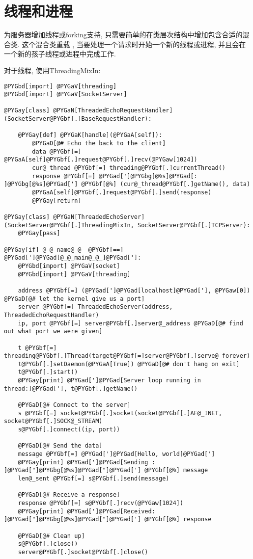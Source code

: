 \documentclass[a4paper,10pt,english]{manual}
\begin{document}
\section{线程和进程}

为服务器增加线程或forking支持, 只需要简单的在类层次结构中增加包含合适的混合类. 这个混合类重载 , 当要处理一个请求时开始一个新的线程或进程, 并且会在一个新的孩子线程或进程中完成工作.

对于线程, 使用ThreadingMixIn:

\begin{Verbatim}[commandchars=@\[\]]
@PYGbd[import] @PYGaV[threading]
@PYGbd[import] @PYGaV[SocketServer]

@PYGay[class] @PYGaN[ThreadedEchoRequestHandler](SocketServer@PYGbf[.]BaseRequestHandler):

    @PYGay[def] @PYGaK[handle](@PYGaA[self]):
        @PYGaD[@# Echo the back to the client]
        data @PYGbf[=] @PYGaA[self]@PYGbf[.]request@PYGbf[.]recv(@PYGaw[1024])
        cur@_thread @PYGbf[=] threading@PYGbf[.]currentThread()
        response @PYGbf[=] @PYGad[']@PYGbg[@%s]@PYGad[: ]@PYGbg[@%s]@PYGad['] @PYGbf[@%] (cur@_thread@PYGbf[.]getName(), data)
        @PYGaA[self]@PYGbf[.]request@PYGbf[.]send(response)
        @PYGay[return]

@PYGay[class] @PYGaN[ThreadedEchoServer](SocketServer@PYGbf[.]ThreadingMixIn, SocketServer@PYGbf[.]TCPServer):
    @PYGay[pass]

@PYGay[if] @_@_name@_@_ @PYGbf[==] @PYGad[']@PYGad[@_@_main@_@_]@PYGad[']:
    @PYGbd[import] @PYGaV[socket]
    @PYGbd[import] @PYGaV[threading]

    address @PYGbf[=] (@PYGad[']@PYGad[localhost]@PYGad['], @PYGaw[0]) @PYGaD[@# let the kernel give us a port]
    server @PYGbf[=] ThreadedEchoServer(address, ThreadedEchoRequestHandler)
    ip, port @PYGbf[=] server@PYGbf[.]server@_address @PYGaD[@# find out what port we were given]

    t @PYGbf[=] threading@PYGbf[.]Thread(target@PYGbf[=]server@PYGbf[.]serve@_forever)
    t@PYGbf[.]setDaemon(@PYGaA[True]) @PYGaD[@# don't hang on exit]
    t@PYGbf[.]start()
    @PYGay[print] @PYGad[']@PYGad[Server loop running in thread:]@PYGad['], t@PYGbf[.]getName()

    @PYGaD[@# Connect to the server]
    s @PYGbf[=] socket@PYGbf[.]socket(socket@PYGbf[.]AF@_INET, socket@PYGbf[.]SOCK@_STREAM)
    s@PYGbf[.]connect((ip, port))

    @PYGaD[@# Send the data]
    message @PYGbf[=] @PYGad[']@PYGad[Hello, world]@PYGad[']
    @PYGay[print] @PYGad[']@PYGad[Sending : ]@PYGad["]@PYGbg[@%s]@PYGad["]@PYGad['] @PYGbf[@%] message
    len@_sent @PYGbf[=] s@PYGbf[.]send(message)

    @PYGaD[@# Receive a response]
    response @PYGbf[=] s@PYGbf[.]recv(@PYGaw[1024])
    @PYGay[print] @PYGad[']@PYGad[Received: ]@PYGad["]@PYGbg[@%s]@PYGad["]@PYGad['] @PYGbf[@%] response

    @PYGaD[@# Clean up]
    s@PYGbf[.]close()
    server@PYGbf[.]socket@PYGbf[.]close()
\end{Verbatim}
\end{document}
